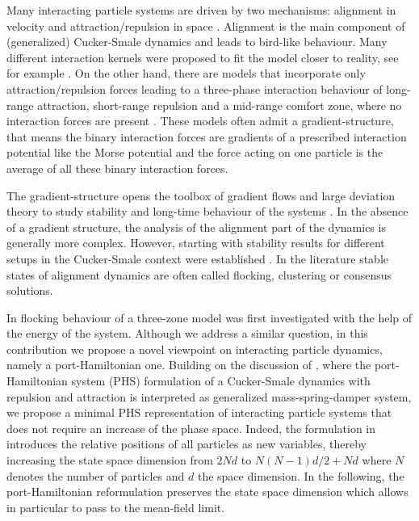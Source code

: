 \documentclass[11pt]{article}
\begin{document}
\begin{bibunit}[abbrv]
Many interacting particle systems are driven by two mechanisms: alignment in velocity and attraction/repulsion in space \cite{carrillo2017review}. Alignment is the main component of (generalized) Cucker-Smale dynamics and leads to bird-like behaviour. Many different interaction kernels were proposed to fit the model closer to reality, see for example \cite{ahn2012collision,carrillo2017sharp,cucker2011general,motsch2011newmodel}. 
%
On the other hand, there are models that incorporate only attraction/repulsion forces leading to a three-phase interaction behaviour of long-range attraction, short-range repulsion and a mid-range comfort zone, where no interaction forces are present \cite{albi2013modeling,Dorsogna2006self,Cao2020MBE}. These models often admit a gradient-structure, that means the binary interaction forces are gradients of a prescribed interaction potential like the Morse potential \cite{hydro} and the force acting on one particle is the average of all these binary interaction forces.

The gradient-structure opens the toolbox of gradient flows and large deviation theory to study stability and long-time behaviour of the systems \cite{ambrosio2005gradient}. In the absence of a gradient structure, the analysis of the alignment part of the dynamics is generally more complex. However, starting with \cite{carrillo2010asymptotic} stability results for different setups in the Cucker-Smale context were established \cite{motsch2014review,park2010cucker,ha2019complete,choi2016cucker,cho2016emergence,erban2016cucker,barbaro2016phase,pignotti2017convergence,albi2014stability}. In the literature stable states of alignment dynamics are often called flocking, clustering or consensus solutions. 

In \cite{Cao2020MBE} flocking behaviour of a three-zone model was first investigated with the help of the energy of the system. Although we address a similar question, in this contribution we propose a novel viewpoint on interacting particle dynamics, namely a port-Hamiltonian one. Building on the discussion of \cite{Matei}, where the port-Hamilto\-nian system (PHS) formulation of a Cucker-Smale dynamics with repulsion and attraction is interpreted as generalized mass-spring-damper system, we propose a minimal PHS representation of interacting particle systems that does not require an increase of the phase space. Indeed, the formulation in \cite{Matei} introduces the relative positions of all particles as new variables, thereby increasing the state space dimension from $2Nd$ to $N(N-1)d/2 + Nd$ where $N$ denotes the number of particles and $d$ the space dimension. In the following, the port-Hamiltonian reformulation preserves the state space dimension which allows in particular to pass to the mean-field limit. 


\end{bibunit}
\end{document}
